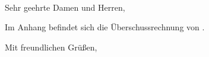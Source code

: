 \documentclass[a4paper, 12pt, KOMAold]{scrlttr2}
\begin{document}
    \begin{letter}{\Empfaenger \\ \EStrasse \\ \EPLZ~\EOrt}
    \date{\today}%
    \subject{Einnahmenüberschussrechnung \Year}
    \opening{Sehr geehrte Damen und Herren,}

    Im Anhang befindet sich die Überschussrechnung von \Year.

    \closing{Mit freundlichen Grüßen,}
    \end{letter}

    
\end{document}
